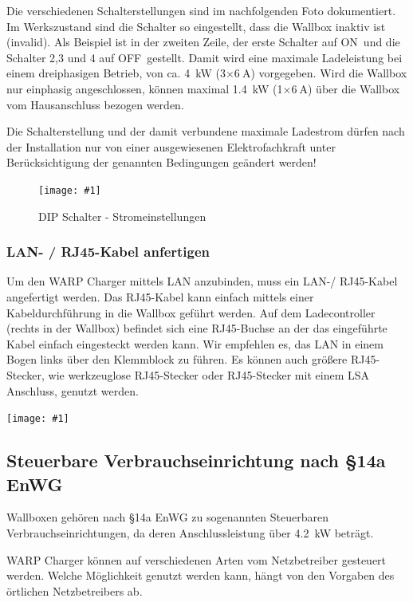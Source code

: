 \documentclass[a4paper,10pt]{article}
\newcommand{\hint}[1]{\begin{tcolorbox}[colback=boxgray,colframe=black,coltext=
white,title=Hinweis,left*=2mm,right*=2mm,boxsep=1mm,bottom=1mm,top=1mm]#1\end{tcolorbox}}
\newcommand{\gfx}[1]{\texttt{[image: \#1]}}
\begin{document}
\begin{multicols*}{2}
    Die verschiedenen Schalterstellungen sind im nachfolgenden Foto dokumentiert.
    Im Werkszustand sind die Schalter so eingestellt, dass die Wallbox inaktiv
	ist (\glqq invalid\grqq). 
	Als Beispiel ist in der zweiten Zeile, der erste Schalter auf \glqq
	ON\grqq~und die Schalter 2,3 und 4 auf \glqq OFF\grqq~gestellt.
    Damit wird eine maximale Ladeleistung bei einem dreiphasigen
    Betrieb, von ca. \SI{4}{\kilo\watt} (3$\times\SI{6}{\ampere}$) vorgegeben.
    Wird die Wallbox nur einphasig angeschlossen, können maximal
    \SI{1,4}{\kilo\watt} (1$\times\SI{6}{\ampere}$) über die Wallbox vom Hausanschluss
    bezogen werden.

    \hint{Die Schalterstellung und der damit verbundene maximale Ladestrom dürfen nach der
          Installation nur von einer ausgewiesenen Elektrofachkraft unter
          Berücksichtigung der genannten Bedingungen geändert werden!}
    \begin{figure}[H]
    	\gfx{./img_warp3/resized/warp3_switches.jpg}
        \caption*{DIP Schalter - Stromeinstellungen}
    \end{figure}

    \subsubsection{LAN- / RJ45-Kabel anfertigen}\label{ethernet}

    Um den WARP Charger mittels LAN anzubinden, muss ein LAN-/ RJ45-Kabel
    angefertigt werden. Das RJ45-Kabel kann einfach mittels einer
    Kabeldurchführung in die Wallbox geführt werden. Auf dem Ladecontroller
	(rechts in der Wallbox) befindet sich eine RJ45-Buchse an der das
	eingeführte Kabel einfach eingesteckt werden kann. Wir empfehlen es, das LAN
	in einem Bogen links über den Klemmblock zu führen. 
	Es können auch größere RJ45-Stecker, wie werkzeuglose RJ45-Stecker oder RJ45-Stecker 
	mit einem LSA Anschluss, genutzt werden.

    \gfx{./img_warp3/resized/warp3_pro_open_highlighted_LAN.jpg} %

    \subsection{Steuerbare Verbrauchseinrichtung nach \S14a EnWG}
    Wallboxen gehören nach \S14a EnWG zu sogenannten Steuerbaren
    Verbrauchseinrichtungen, da deren Anschlussleistung über \SI{4,2}{\kilo\watt} beträgt.

    WARP Charger können auf verschiedenen Arten vom Netzbetreiber gesteuert werden.
    Welche Möglichkeit genutzt werden kann, hängt von den Vorgaben des örtlichen Netzbetreibers ab.


\end{multicols*}
\end{document}
